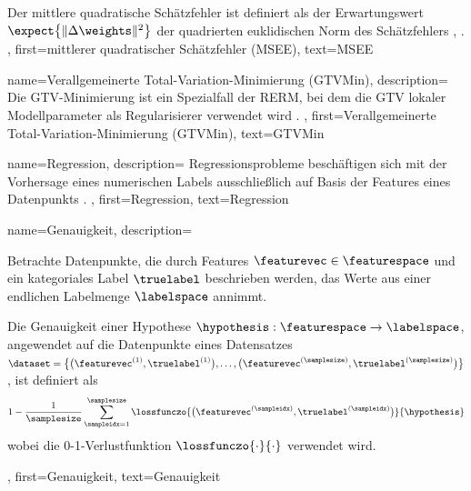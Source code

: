 {{{{{		Der mittlere quadratische \gls{Schätzfehler} ist definiert als der Erwartungswert $\expect \big\{ \| \Delta \weights \|^{2} \big\}$ 
		der quadrierten euklidischen \gls{Norm} des Schätzfehlers \cite{LC}, \cite{kay}.
	},
	first={mittlerer quadratischer Schätzfehler (MSEE)},
	text={MSEE}
}

{
	name={Verallgemeinerte Total-Variation-Minimierung (GTVMin)},
	description={
		Die \gls{GTV}-Minimierung ist ein Spezialfall der \gls{RERM}, 
		bei dem die \gls{GTV} lokaler \gls{Modellparameter} als \gls{Regularisierer} verwendet wird \cite{ClusteredFLTVMinTSP}.
	},
	first={Verallgemeinerte Total-Variation-Minimierung (GTVMin)},
	text={GTVMin}
}

{
	name={Regression},
	description={
		Regressionsprobleme beschäftigen sich mit der Vorhersage eines numerischen \gls{Labels} 
		ausschließlich auf Basis der \gls{Features} eines \gls{Datenpunkts} \cite[Kap.~2]{MLBasics}.
	},
	first={Regression},
	text={Regression}
}
{
	name={Genauigkeit},
	description={
		Betrachte \gls{Datenpunkte}, die durch \gls{Features} $\featurevec \in \featurespace$ 
		und ein kategoriales \gls{Label} $\truelabel$ beschrieben werden, das Werte aus einer endlichen 
		\gls{Labelmenge} $\labelspace$ annimmt. 
		
		Die Genauigkeit einer \gls{Hypothese} $\hypothesis: \featurespace \rightarrow \labelspace$, 
		angewendet auf die \gls{Datenpunkte} eines \gls{Datensatzes} 
		$\dataset = \big\{ \big(\featurevec^{(1)}, \truelabel^{(1)} \big), \ldots, \big(\featurevec^{(\samplesize)},\truelabel^{(\samplesize)}\big) \big\}$, 
		ist definiert als
		\[
		1 - \frac{1}{\samplesize} \sum_{\sampleidx=1}^{\samplesize} 
		\lossfunczo{\big(\featurevec^{(\sampleidx)},\truelabel^{(\sampleidx)}\big)}{\hypothesis}
		\]
		wobei die \gls{0-1-Verlustfunktion} $\lossfunczo{\cdot}{\cdot}$ verwendet wird.
	},
	first={Genauigkeit},
	text={Genauigkeit}
}

}}}
